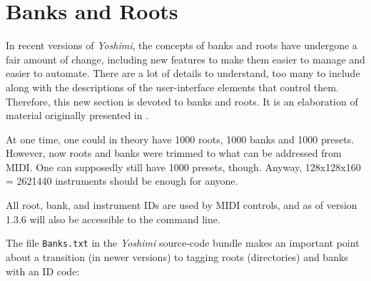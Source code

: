 %
%
%

\section{Banks and Roots}
\label{sec:banks_and_roots}

   In recent versions of \textsl{Yoshimi}, the concepts of banks and roots
   have undergone a fair amount of change, including new features to make
   them easier to manage and easier to automate.  There are a lot of details
   to understand, too many to include along with the descriptions of the
   user-interface elements that control them.
   Therefore, this new section is devoted to banks and roots.
   It is an elaboration of material originally presented in
   .

   At one time, one could in theory have 1000 roots, 1000 banks and 1000
   presets.  However, now roots and banks were trimmed to what can be
   addressed from MIDI. One can supposedly still have 1000 presets, though.
   Anyway, 128x128x160 = 2621440 instruments should be enough for anyone.

   All root, bank, and instrument IDs are used by MIDI controls, and as of
   version 1.3.6 will also be accessible to the command line.

   The file \texttt{Banks.txt} in the \textsl{Yoshimi} source-code bundle
   makes an important point about a transition (in newer versions)
   to tagging roots (directories) and banks with an ID code:

